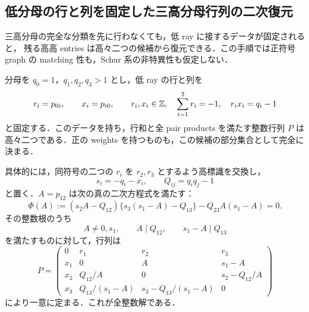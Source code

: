 \subsection{低分母の行と列を固定した三高分母行列の二次復元}
\label{fc17:section}

三高分母の完全な分類を先に行わなくても，低 ray に接するデータが固定されると，
残る高高 entries は高々二つの候補から復元できる．この手順では正符号 graph の
matching 性も，Schur 系の非特異性も仮定しない．

\begin{proposition}[固定低行列データの完全復元]
\label{fc17:at-most-two}
分母を $q_0=1$，$q_1,q_2,q_3>1$ とし，低 ray の行と列を
\[
 r_i=p_{0i},\qquad x_i=p_{i0},\qquad
 r_i,x_i\in\mathbb Z,\quad \sum_{i=1}^3r_i=-1,\quad r_ix_i=q_i-1
\]
と固定する．このデータを持ち，行和と全 pair products を満たす整数行列 $P$ は
高々二つである．正の weights を持つものも，この候補の部分集合として完全に決まる．

具体的には，同符号の二つの $r_i$ を $r_2,r_3$ とするよう高標識を交換し，
\[
 s_i=-q_i-x_i,\qquad Q_{ij}=q_iq_j-1
\]
と置く．$A=p_{12}$ は次の真の二次方程式を満たす：
\begin{equation}\label{fc17:quadratic}
 \Phi(A):=(s_2A-Q_{12})\{s_3(s_1-A)-Q_{13}\}
             -Q_{23}A(s_1-A)=0.
\end{equation}
その整数根のうち
\begin{equation}\label{fc17:divisibility}
 A\ne0,s_1,\qquad A\mid Q_{12},\qquad s_1-A\mid Q_{13}
\end{equation}
を満たすものに対して，行列は
\begin{equation}\label{fc17:complete-P}
 P=\begin{pmatrix}
 0&r_1&r_2&r_3\\
 x_1&0&A&s_1-A\\
 x_2&Q_{12}/A&0&s_2-Q_{12}/A\\
 x_3&Q_{13}/(s_1-A)&s_3-Q_{13}/(s_1-A)&0
 \end{pmatrix}
\end{equation}
により一意に定まる．これが全整数解である．
\end{proposition}

